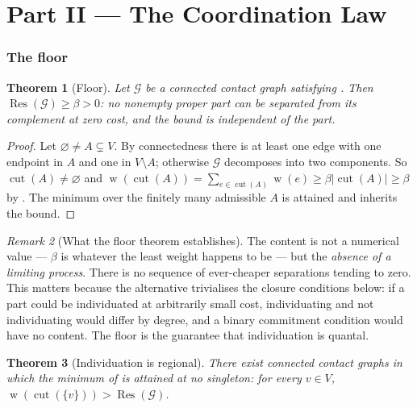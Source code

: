 \documentclass[11pt,a4paper]{article}
\theoremstyle{clstyle}
\newtheorem{theorem}{Theorem}[section]
\theoremstyle{definition}
\theoremstyle{remark}
\newtheorem{remark}[theorem]{Remark}
\DeclareMathOperator{\wt}{w}
\DeclareMathOperator{\cut}{cut}
\DeclareMathOperator{\Res}{Res}
\newcommand{\Gph}{\mathcal{G}}
\newcommand{\V}{V}
\newcommand{\flo}{\beta}
\newcommand{\abs}[1]{\lvert#1\rvert}
\begin{document}
\part*{Part II --- The Coordination Law}

\section{The floor}
\label{sec:floor}

\begin{theorem}[Floor]
\label{thm:floor}
Let $\Gph$ be a connected contact graph satisfying . Then
$\Res(\Gph)\ge\flo>0$: no nonempty proper part can be separated from its
complement at zero cost, and the bound is independent of the part.
\end{theorem}

\begin{proof}
Let $\varnothing\neq A\subsetneq\V$. By connectedness there is at least one
edge with one endpoint in $A$ and one in $\V\setminus A$; otherwise $\Gph$
decomposes into two components. So $\cut(A)\neq\varnothing$ and
$\wt(\cut(A))=\sum_{e\in\cut(A)}\wt(e)\ge\flo\abs{\cut(A)}\ge\flo$ by
. The minimum over the finitely many admissible $A$ is
attained and inherits the bound.
\end{proof}

\begin{remark}[What the floor theorem establishes]
\label{rem:floor-content}
The content is not a numerical value --- $\flo$ is whatever the least weight
happens to be --- but the \emph{absence of a limiting process}. There is no
sequence of ever-cheaper separations tending to zero. This matters because
the alternative trivialises the closure conditions below: if a part could be
individuated at arbitrarily small cost, individuating and not individuating
would differ by degree, and a binary commitment condition would have no
content. The floor is the guarantee that individuation is quantal.
\end{remark}

\begin{theorem}[Individuation is regional]
\label{thm:regional}
There exist connected contact graphs in which the minimum of 
is attained at no singleton: for every $v\in\V$,
$\wt(\cut(\{v\}))>\Res(\Gph)$.
\end{theorem}
\end{document}
